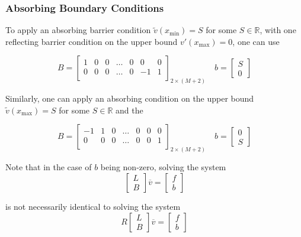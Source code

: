 \documentclass[11pt]{article}
\theoremstyle{definition}
\begin{document}
\subsubsection{Absorbing Boundary Conditions}
To apply an absorbing barrier condition $\tilde{v}(x_{\min}) =S$ for some $S \in \mathbb{R}$, with one reflecting barrier condition on the upper bound $v'(x_{\max}) = 0$, one can use

\begin{equation}\label{eq:absorbing-barrier-matrix-lb-regular}
B = \begin{bmatrix}
1 & 0 & 0 & \dots & 0 & 0 & 0 \\
0 & 0 & 0 & \dots & 0 & -1 & 1\\
\end{bmatrix}_{2 \times (M+2)} \quad
b = \begin{bmatrix}
S \\
0
\end{bmatrix}
\end{equation}

Similarly, one can apply an absorbing condition on the upper bound  $\tilde{v}(x_{\max}) =S$ for some $S \in \mathbb{R}$ and the


\begin{equation}\label{eq:absorbing-barrier-matrix-ub-regular}
B = \begin{bmatrix}
-1 & 1 & 0 & \dots & 0 & 0 & 0 \\
0 & 0 & 0 & \dots & 0 & 0 & 1\\
\end{bmatrix}_{2 \times (M+2)} \quad
b = \begin{bmatrix}
0 \\
S
\end{bmatrix}
\end{equation}

Note that in the case of $b$ being non-zero, solving the system 
\begin{equation}
\begin{bmatrix}
 L \\
 B
\end{bmatrix} 
\overline{v} 
=
\begin{bmatrix}
f \\
b
\end{bmatrix}
\end{equation}

is not necessarily identical to solving the system
\begin{equation}
R \begin{bmatrix}
 L \\
 B
\end{bmatrix} 
\overline{v}
=
\begin{bmatrix}
f \\
b
\end{bmatrix}
\end{equation}
\end{document}
